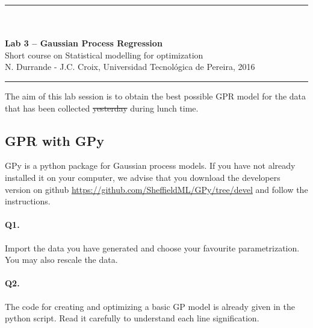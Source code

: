 \documentclass[12pt]{scrartcl}
\begin{document}
\begin{center}
	\rule{\textwidth}{1pt}
	\\ \ \\
	{\LARGE \textbf{Lab 3 -- Gaussian Process Regression}}\\ 
	\vspace{3mm}
	{\large Short course on Statistical modelling for optimization\\ \vspace{3mm}}
	{\normalsize N. Durrande - J.C. Croix, Universidad Tecnol\'ogica de Pereira, 2016}\\ 
	\vspace{3mm}
	\rule{\textwidth}{1pt}
	\vspace{5mm}
\end{center}
The aim of this lab session is to obtain the best possible GPR model for the data that has been collected \sout{yesterday} during lunch time.

\subsection*{GPR with GPy}
GPy is a python package for Gaussian process models. If you have not already installed it on your computer, we advise that you download the developers version on github \url{https://github.com/SheffieldML/GPy/tree/devel} and follow the instructions.%

\paragraph{Q1.} Import the data you have generated and choose your favourite parametrization. You may also rescale the data.

\paragraph{Q2.} 
The code for creating and optimizing a basic GP model is already given in the python script. Read it carefully to understand each line signification.
\end{document}
